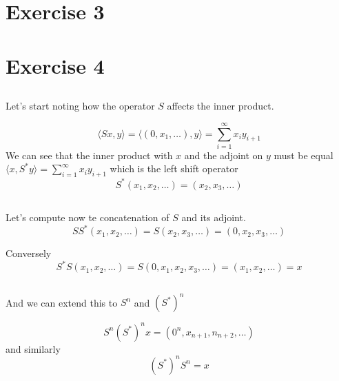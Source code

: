 \documentclass[a4paper,12pt]{article} %
\begin{document}
\section{Exercise 3}





\section{Exercise 4}
\subsection{}

Let's start noting how the operator \(S\) affects the inner product.

\[
    \langle Sx,y \rangle = \langle (0,x_1  , \dots ),y \rangle = \sum_{i=1}^{\infty} x_i y_{i+1}
\]
We can see that the inner product with \(x\) and the adjoint on \(y\) must be equal  \(\langle x,S^*y \rangle=\sum_{i=1}^{\infty} x_i y_{i+1} \)
which is the left shift operator
\[
    S^*(x_1,x_2,\dots ) = (x_2,x_3, \dots  )
\]
\subsection{}
Let's compute now te concatenation of \(S\) and its adjoint.
\[
    SS^*(x_1,x_2,\dots )=S(x_2,x_3, \dots  ) = (0,x_2,x_3, \dots  )
\]

Conversely
\[
    S^*S(x_1,x_2,\dots )=S(0,x_1,x_2,x_3, \dots  ) = (x_1,x_2, \dots  ) = x
\]

\subsection{}
And we can extend this to \(S^n\) and \((S^*)^n\)

\[
    S^n (S^*)^nx = (0^n,x_{n+1}, n_{n+2},\dots )
\]
and similarly
\[
    (S^*)^n S^n = x
\]
\end{document}
